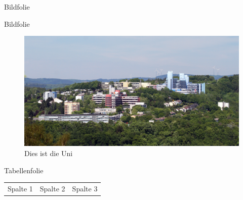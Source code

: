 \documentclass[aspectratio=169]{beamer}
\begin{document}
\begin{frame}{Bildfolie}
\begin{minipage}{.31\textwidth}
	\end{minipage}
\end{frame}

\begin{frame}{Bildfolie}
	\begin{figure}
		\includegraphics[height=.5\textheight]{img/progress.jpg}
		\caption{Dies ist die Uni}
	\end{figure}
\end{frame}

\begin{frame}{Tabellenfolie}
	\begin{table}
		\begin{tabular}{l | l | l}
			\rowcolor{unigrau}
			
			Spalte 1 & Spalte 2 & Spalte 3\\
		\end{tabular}
	\end{table}
\end{frame}
\end{document}
